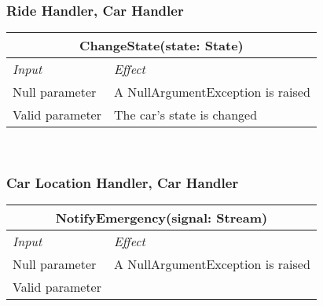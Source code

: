 			\subsubsection*{Ride Handler, Car Handler}
			\begin{tabular}{ |l|l| }
				\hline
				\multicolumn{2}{|c|}{ChangeState(state: State)}\\
				\hline
				\textit{Input}&\textit{Effect}\\ \hline
				Null parameter & A NullArgumentException is raised\\ \hline
				Valid parameter & The car's state is changed \\ \hline
			\end{tabular}
			\\
			
			\subsubsection*{Car Location Handler, Car Handler} %
			\begin{tabular}{ |l|l| }
				\hline
				\multicolumn{2}{|c|}{NotifyEmergency(signal: Stream)}\\
				\hline
				\textit{Input}&\textit{Effect}\\ \hline
				Null parameter & A NullArgumentException is raised\\ \hline
				Valid parameter &  \\ \hline
			\end{tabular}
			\\		
			
